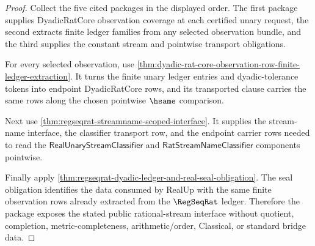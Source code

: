 \begin{proof}
Collect the five cited packages in the displayed order. The first package
supplies DyadicRatCore observation coverage at each certified unary request,
the second extracts finite ledger families from any selected observation
bundle, and the third supplies the constant stream and pointwise transport
obligations.

For every selected observation, use
\autoref{thm:dyadic-rat-core-observation-row-finite-ledger-extraction}. It
turns the finite unary ledger entries and dyadic-tolerance tokens into endpoint
DyadicRatCore rows, and its transported clause carries the same rows along the
chosen pointwise $\hsame$ comparison.

Next use \autoref{thm:regseqrat-streamname-scoped-interface}. It supplies the
stream-name interface, the classifier transport row, and the endpoint carrier
rows needed to read the $\mathsf{RealUnaryStreamClassifier}$ and
$\mathsf{RatStreamNameClassifier}$ components pointwise.

Finally apply
\autoref{thm:regseqrat-dyadic-ledger-and-real-seal-obligation}. The seal
obligation identifies the data consumed by RealUp with the same finite
observation rows already extracted from the $\RegSeqRat$ ledger. Therefore the
package exposes the stated public rational-stream interface without quotient,
completion, metric-completeness, arithmetic/order, Classical, or standard
bridge data.
\end{proof}

